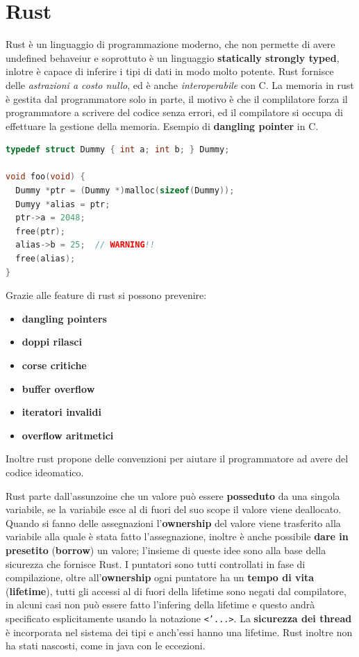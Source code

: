 \documentclass[12pt]{article}
\begin{document}
\newpage
\section{Rust}
Rust \`e un linguaggio di programmazione moderno, che non permette di avere undefined behaveiur e soprottuto \`e un linguaggio \textbf{statically strongly typed}, inlotre \`e capace di inferire i tipi di dati in modo molto potente. Rust fornisce delle \emph{astrazioni a costo nullo}, ed \`e anche \emph{interoperabile} con C. La memoria in rust \`e gestita dal programmatore solo in parte, il motivo \`e che il complilatore forza il programmatore a scrivere del codice senza errori, ed il compilatore si occupa di effettuare la gestione della memoria. Esempio di \textbf{dangling pointer} in C.
\begin{lstlisting}[language=c]
typedef struct Dummy { int a; int b; } Dummy;

void foo(void) {
  Dummy *ptr = (Dummy *)malloc(sizeof(Dummy));
  Dumyy *alias = ptr;
  ptr->a = 2048;
  free(ptr);
  alias->b = 25;  // WARNING!!
  free(alias);
}
\end{lstlisting}
Grazie alle feature di rust si possono prevenire:
\begin{itemize}
  \item \textbf{dangling pointers}
  \item \textbf{doppi rilasci}
  \item \textbf{corse critiche}
  \item \textbf{buffer overflow}
  \item \textbf{iteratori invalidi}
  \item \textbf{overflow aritmetici}
\end{itemize}
Inoltre rust propone delle convenzioni per aiutare il programmatore ad avere del codice ideomatico.

Rust parte dall'assunzoine che un valore pu\`o essere \textbf{posseduto} da una singola variabile, se la variabile esce al di fuori del suo scope il valore viene deallocato. Quando si fanno delle assegnazioni l'\textbf{ownership} del valore viene trasferito alla variabile alla quale \`e stata fatto l'assegnazione, inoltre \`e anche possibile \textbf{dare in presetito} (\textbf{borrow}) un valore; l'insieme di queste idee sono alla base della sicurezza che fornisce Rust. I puntatori sono tutti controllati in fase di compilazione, oltre all'\textbf{ownership} ogni puntatore ha un \textbf{tempo di vita} (\textbf{lifetime}), tutti gli accessi al di fuori della lifetime sono negati dal compilatore, in alcuni casi non pu\`o essere fatto l'infering della lifetime e questo andr\`a specificato esplicitamente usando la notazione \texttt{<'...>}. La \textbf{sicurezza dei thread} \`e incorporata nel sistema dei tipi e anch'essi hanno una lifetime. Rust inoltre non ha stati nascosti, come in java con le eccezioni.
\end{document}
